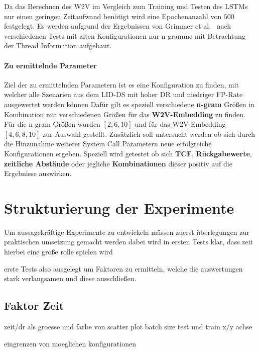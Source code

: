                 Da das Berechnen des \ac{W2V} im Vergleich zum Training und Testen des \acp{LSTM} nur einen geringen Zeitaufwand benötigt wird eine Epochenanzahl von $500$ festgelegt. 
                Es werden aufgrund der Ergebnissen von Grimmer et al.~\cite{IDSTHREADGRIMMER2021} nach verschiedenen Tests mit alten Konfigurationen nur n-gramme mit Betrachtung der Thread Information aufgebaut.

            \paragraph{Zu ermittelnde Parameter}
            Ziel der zu ermittelnden Parametern ist es eine Konfiguration zu finden, mit welcher alle Szenarien aus dem \ac{LID-DS} mit hoher \ac{DR} und niedriger \ac{FP}-Rate ausgewertet werden können
            Dafür gilt es speziell verschiedene \textbf{n-gram} Größen in Kombination mit verschiedenen Größen für das \textbf{\ac{W2V}-Embedding} zu finden.
                Für die n-gram Größen wurden $[2,6,10]$ und für das \ac{W2V}-Embedding $[4,6,8,10]$ zur Auswahl gestellt.
                Zusätzlich soll untersucht werden ob sich durch die Hinzunahme weiterer System Call Parametern neue erfolgreiche Konfigurationen ergeben.
                Speziell wird getestet ob sich \textbf{\ac{TCF}}, \textbf{Rückgabewerte}, \textbf{zeitliche Abstände} oder jegliche \textbf{Kombinationen} dieser positiv auf die Ergebnisse auswirken.
                
\iffalse
    \section{Strukturierung der Experimente}\label{sec:StrukExp}
        Um aussagekräftige Experimente zu entwickeln müssen zuerst 
        überlegungen zur praktischen umsetzung gemacht werden
        dabei wird in ersten Tests klar, dass zeit hierbei eine große rolle spielen wird

        erste Tests also ausgelegt um Faktoren zu ermitteln, welche die auswertungen stark verlangsamen
        und diese ausschließen.

        \subsection{Faktor Zeit}
            zeit/dr als groesse und farbe von scatter plot
            batch size test und train x/y achse

            eingrenzen von moeglichen konfigurationen

